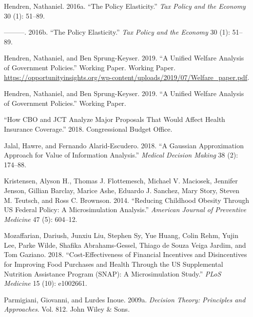 \documentclass[
  10pt,
]{article}
\begin{document}
\leavevmode\hypertarget{ref-hendrenPolicyElasticity2016}{}%
Hendren, Nathaniel. 2016a. ``The Policy Elasticity.'' \emph{Tax Policy
and the Economy} 30 (1): 51--89.

\leavevmode\hypertarget{ref-Hendrenpolicyelasticity2016}{}%
---------. 2016b. ``The Policy Elasticity.'' \emph{Tax Policy and the
Economy} 30 (1): 51--89.

\leavevmode\hypertarget{ref-hendrenUnifiedWelfareAnalysis2019}{}%
Hendren, Nathaniel, and Ben Sprung-Keyser. 2019. ``A Unified Welfare
Analysis of Government Policies.'' Working Paper. Working Paper.
\url{https://opportunityinsights.org/wp-content/uploads/2019/07/Welfare_paper.pdf}.

\leavevmode\hypertarget{ref-hendren_unified_2019}{}%
Hendren, Nathaniel, and Ben Sprung-Keyser. 2019. ``A Unified Welfare
Analysis of Government Policies.'' Working Paper.

\leavevmode\hypertarget{ref-HowCBOJCT2018}{}%
``How CBO and JCT Analyze Major Proposals That Would Affect Health
Insurance Coverage.'' 2018. Congressional Budget Office.

\leavevmode\hypertarget{ref-jalal_gaussian_2018}{}%
Jalal, Hawre, and Fernando Alarid-Escudero. 2018. ``A Gaussian
Approximation Approach for Value of Information Analysis.''
\emph{Medical Decision Making} 38 (2): 174--88.

\leavevmode\hypertarget{ref-kristensenReducingChildhoodObesity2014}{}%
Kristensen, Alyson H., Thomas J. Flottemesch, Michael V. Maciosek,
Jennifer Jenson, Gillian Barclay, Marice Ashe, Eduardo J. Sanchez, Mary
Story, Steven M. Teutsch, and Ross C. Brownson. 2014. ``Reducing
Childhood Obesity Through US Federal Policy: A Microsimulation
Analysis.'' \emph{American Journal of Preventive Medicine} 47 (5):
604--12.

\leavevmode\hypertarget{ref-mozaffarianCosteffectivenessFinancialIncentives2018}{}%
Mozaffarian, Dariush, Junxiu Liu, Stephen Sy, Yue Huang, Colin Rehm,
Yujin Lee, Parke Wilde, Shafika Abrahams-Gessel, Thiago de Souza Veiga
Jardim, and Tom Gaziano. 2018. ``Cost-Effectiveness of Financial
Incentives and Disincentives for Improving Food Purchases and Health
Through the US Supplemental Nutrition Assistance Program (SNAP): A
Microsimulation Study.'' \emph{PLoS Medicine} 15 (10): e1002661.

\leavevmode\hypertarget{ref-parmigianiDecisionTheoryPrinciples2009}{}%
Parmigiani, Giovanni, and Lurdes Inoue. 2009a. \emph{Decision Theory:
Principles and Approaches}. Vol. 812. John Wiley \& Sons.
\end{document}
